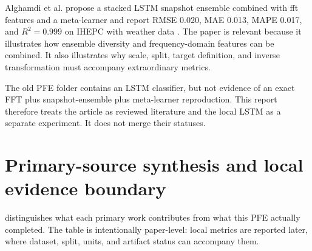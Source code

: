 Alghamdi et al. propose a stacked LSTM snapshot ensemble combined with \ac{fft} features and a meta-learner and report RMSE 0.020, MAE 0.013, MAPE 0.017, and $R^2=0.999$ on IHEPC with weather data \cite{alghamdi2024snapshot}. The paper is relevant because it illustrates how ensemble diversity and frequency-domain features can be combined. It also illustrates why scale, split, target definition, and inverse transformation must accompany extraordinary metrics.

The old PFE folder contains an LSTM classifier, but not evidence of an exact FFT plus snapshot-ensemble plus meta-learner reproduction. This report therefore treats the article as reviewed literature and the local LSTM as a separate experiment. It does not merge their statuses.

\section{Primary-source synthesis and local evidence boundary}

 distinguishes what each primary work contributes from what this PFE actually completed. The table is intentionally paper-level: local metrics are reported later, where dataset, split, units, and artifact status can accompany them.

